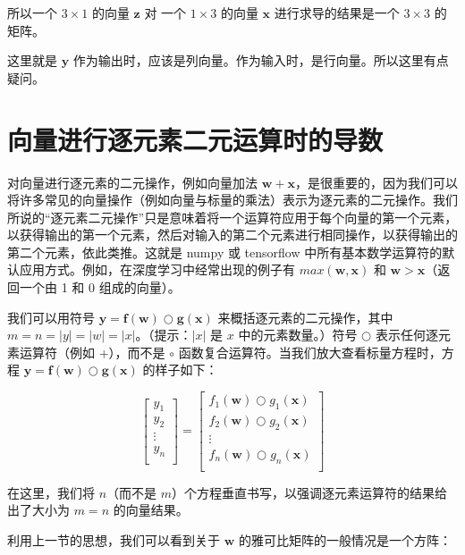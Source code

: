\documentclass[lang=cn,newtx,10pt,scheme=chinese]{elegantbook}
\begin{document}
所以一个 $3 \times 1$ 的向量 $\mathbf{z}$ 对 一个 $1 \times 3$ 的向量 $\mathbf{x}$ 进行求导的结果是一个 $3 \times 3$ 的矩阵。

这里就是 $\mathbf{y}$ 作为输出时，应该是列向量。作为输入时，是行向量。所以这里有点疑问。

\section{向量进行逐元素二元运算时的导数}

对向量进行逐元素的二元操作，例如向量加法 $\mathbf{w} + \mathbf{x}$，是很重要的，因为我们可以将许多常见的向量操作（例如向量与标量的乘法）表示为逐元素的二元操作。我们所说的“逐元素二元操作”只是意味着将一个运算符应用于每个向量的第一个元素，以获得输出的第一个元素，然后对输入的第二个元素进行相同操作，以获得输出的第二个元素，依此类推。这就是 numpy 或 tensorflow 中所有基本数学运算符的默认应用方式。例如，在深度学习中经常出现的例子有 $max(\mathbf{w},\mathbf{x})$ 和 $\mathbf{w} > \mathbf{x}$（返回一个由 1 和 0 组成的向量）。

我们可以用符号 $\mathbf{y} = \mathbf{f(w)} \bigcirc \mathbf{g(x)}$ 来概括逐元素的二元操作，其中 $m=n=|y|=|w|=|x|$。（提示：$|x|$ 是 $x$ 中的元素数量。）符号 $\bigcirc$ 表示任何逐元素运算符（例如 $+$），而不是 $\circ$ 函数复合运算符。当我们放大查看标量方程时，方程 $\mathbf{y} = \mathbf{f(w)} \bigcirc \mathbf{g(x)}$ 的样子如下：

\[\begin{bmatrix}
           y_1\\
           y_2\\
           \vdots \\
           y_n\\
           \end{bmatrix} = \begin{bmatrix}
           f_{1}(\mathbf{w}) \bigcirc g_{1}(\mathbf{x})\\
           f_{2}(\mathbf{w}) \bigcirc g_{2}(\mathbf{x})\\
           \vdots \\
           f_{n}(\mathbf{w}) \bigcirc g_{n}(\mathbf{x})\\
         \end{bmatrix}\]

在这里，我们将 $n$（而不是 $m$）个方程垂直书写，以强调逐元素运算符的结果给出了大小为 $m=n$ 的向量结果。

利用上一节的思想，我们可以看到关于 $\mathbf{w}$ 的雅可比矩阵的一般情况是一个方阵：
\end{document}
